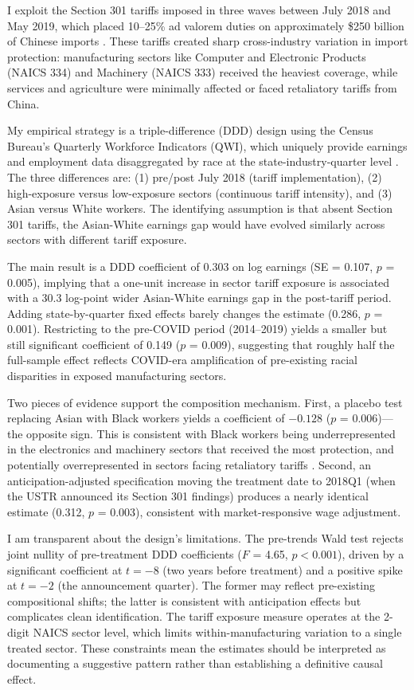 \documentclass[12pt]{article}
\begin{document}
I exploit the Section 301 tariffs imposed in three waves between July 2018 and May 2019, which placed 10--25\% ad valorem duties on approximately \$250 billion of Chinese imports \citep{fajgelbaum2020return,amiti2019impact}. These tariffs created sharp cross-industry variation in import protection: manufacturing sectors like Computer and Electronic Products (NAICS 334) and Machinery (NAICS 333) received the heaviest coverage, while services and agriculture were minimally affected or faced retaliatory tariffs from China.

My empirical strategy is a triple-difference (DDD) design using the Census Bureau's Quarterly Workforce Indicators (QWI), which uniquely provide earnings and employment data disaggregated by race at the state-industry-quarter level \citep{abowd2009lehd}. The three differences are: (1) pre/post July 2018 (tariff implementation), (2) high-exposure versus low-exposure sectors (continuous tariff intensity), and (3) Asian versus White workers. The identifying assumption is that absent Section 301 tariffs, the Asian-White earnings gap would have evolved similarly across sectors with different tariff exposure.

The main result is a DDD coefficient of 0.303 on log earnings (SE = 0.107, $p$ = 0.005), implying that a one-unit increase in sector tariff exposure is associated with a 30.3 log-point wider Asian-White earnings gap in the post-tariff period. Adding state-by-quarter fixed effects barely changes the estimate (0.286, $p$ = 0.001). Restricting to the pre-COVID period (2014--2019) yields a smaller but still significant coefficient of 0.149 ($p$ = 0.009), suggesting that roughly half the full-sample effect reflects COVID-era amplification of pre-existing racial disparities in exposed manufacturing sectors.

Two pieces of evidence support the composition mechanism. First, a placebo test replacing Asian with Black workers yields a coefficient of $-0.128$ ($p$ = 0.006)---the opposite sign. This is consistent with Black workers being underrepresented in the electronics and machinery sectors that received the most protection, and potentially overrepresented in sectors facing retaliatory tariffs \citep{autor2013china,pierce2016surprisingly}. Second, an anticipation-adjusted specification moving the treatment date to 2018Q1 (when the USTR announced its Section 301 findings) produces a nearly identical estimate (0.312, $p$ = 0.003), consistent with market-responsive wage adjustment.

I am transparent about the design's limitations. The pre-trends Wald test rejects joint nullity of pre-treatment DDD coefficients ($F$ = 4.65, $p < 0.001$), driven by a significant coefficient at $t = -8$ (two years before treatment) and a positive spike at $t = -2$ (the announcement quarter). The former may reflect pre-existing compositional shifts; the latter is consistent with anticipation effects but complicates clean identification. The tariff exposure measure operates at the 2-digit NAICS sector level, which limits within-manufacturing variation to a single treated sector. These constraints mean the estimates should be interpreted as documenting a suggestive pattern rather than establishing a definitive causal effect.
\end{document}
